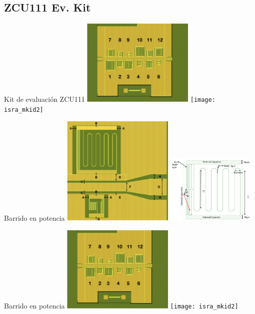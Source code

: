 \documentclass[ignorenonframetext,12pt]{beamer}
\begin{document}
\subsection{ZCU111 Ev. Kit}%
\begin{frame}{Kit de evaluación ZCU111}
				\centering
												\includegraphics[width=0.4\textwidth]{isra_mkid1}
												\texttt{[image: isra\_mkid2]}
\end{frame}
\begin{frame}{Barrido en potencia}
				\centering
												\includegraphics[width=0.4\textwidth]{isra_mkid3}
												\includegraphics[width=0.32\textwidth]{isra_mkid4}
\end{frame}
\begin{frame}{Barrido en potencia}
				\centering
												\includegraphics[width=0.4\textwidth]{isra_mkid1}
												\texttt{[image: isra\_mkid2]}
\end{frame}
\end{document}
